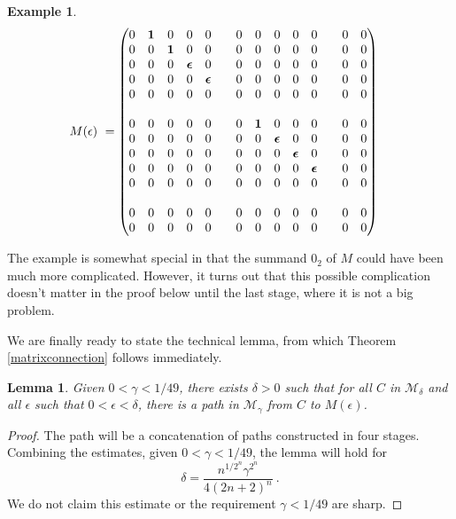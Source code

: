 \documentclass{amsart}
\newtheorem{lemma}[theorem]{Lemma}
\theoremstyle{definition}
\newtheorem{example}[theorem]{Example}
\theoremstyle{remark}
\numberwithin{equation}{section}
\begin{document}
{{\begin{example}
\begin{align*}
\setcounter{MaxMatrixCols}{14} 
M(\epsilon ) \ &= 
\begin{pmatrix} 
0&\mathbf 1 &0&0&0&& 0&0&0&0&0&& 0&0 \\
0&0&\mathbf 1 &0&0&& 0&0&0&0&0&& 0&0 \\ 
0&0&0&\boldsymbol\epsilon   &0&& 0&0&0&0&0&& 0&0 \\ 
0&0&0&0&\boldsymbol\epsilon   && 0&0&0&0&0&& 0&0 \\ 
0&0&0&0&0&& 0&0&0&0&0&& 0&0 \\ 
 & & & & & & & & & & &  & & \\
0&0&0&0&0&  & 0&\mathbf 1 &0&0&0            & &0&0 \\
0&0&0&0&0&  & 0&0&\boldsymbol\epsilon   &0&0& &0&0 \\ 
0&0&0&0&0&  & 0&0&0&\boldsymbol\epsilon   &0& &0&0 \\ 
0&0&0&0&0&  & 0&0&0&0&\boldsymbol\epsilon   & &0&0 \\ 
0&0&0&0&0&  & 0&0&0&0&0                     & &0&0 \\ 
 & & & & & & & & & & &  & & \\
0&0&0&0&0&& 0&0&0&0&0&& 0&0 \\ 
0&0&0&0&0&& 0&0&0&0&0&& 0&0 
\end{pmatrix} 
\end{align*} 
\end{example} 
The example is somewhat special in that the summand 
$0_2$ of $M$ could have been much more complicated. 
However, it turns out that this possible complication 
doesn't matter in the proof below until the last stage, 
where it is not a big problem. 

We are finally ready to state the technical lemma, 
from which Theorem \ref{matrixconnection} follows immediately. 

\begin{lemma} \label{blockconnectionlemma} 
Given $0< \gamma <1/49$, there exists $\delta >0$ such that 
for all $C$ in $\mathcal M_{\delta}$ and all $\epsilon $ 
such that $0<\epsilon < \delta$, there is a path in 
$\mathcal M_{\gamma}$ from $C$ to 
 $M(\epsilon )$. 
\end{lemma} 

\begin{proof} 

The path will be a concatenation of paths constructed in four  stages. 
Combining the estimates, given $0< \gamma < 1/49$, the lemma 
will hold for 
\[
\delta = \frac{ n^{1/2^n} \gamma^{2^n}}{4(2n+2)^n}\ . 
\]
We do not claim this estimate or the requirement $\gamma < 1/49$ are sharp.  


\end{proof}}}
\end{document}
